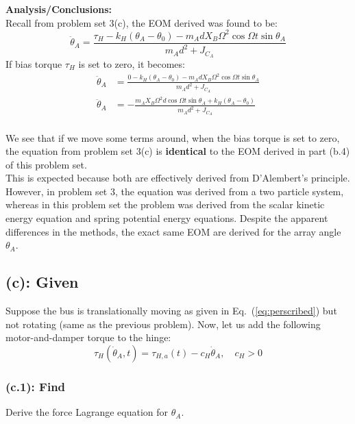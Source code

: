 \documentclass[titlepage]{article}
\begin{document}
\textbf{Analysis/Conclusions:}\\
Recall from problem set 3(c), the EOM derived was found to be:
\begin{equation}
	\ddot{\theta}_A=\frac{\tau_H-k_H(\theta_A-\theta_0)-m_AdX_B\Omega^2\cos\Omega t\sin\theta_A}{m_Ad^2+J_{C_A}}
\end{equation}
If bias torque $\tau_H$ is set to zero, it becomes:
\begin{equation}
	\begin{split}
		\ddot{\theta}_A&=\frac{0-k_H(\theta_A-\theta_0)-m_AdX_B\Omega^2\cos\Omega t\sin\theta_A}{m_Ad^2+J_{C_A}} \\
		\ddot{\theta}_A&=-\frac{m_AX_B\Omega^2d\cos\Omega t\sin\theta_A+k_H(\theta_A-\theta_0)}{m_Ad^2+J_{C_A}} \\
	\end{split}
\end{equation}

\begin{mdframed}[linewidth=1pt, innertopmargin=10pt, innerbottommargin=10pt]
	We see that if we move some terms around, when the bias torque is set to zero, the equation from problem set 3(c) is \textbf{identical} to the EOM derived in part (b.4) of this problem set. \\
	
	This is expected because both are effectively derived from D'Alembert's principle. However, in problem set 3, the equation was derived from a two particle system, whereas in this problem set the problem was derived from the scalar kinetic energy equation and spring potential energy equations. Despite the apparent differences in the methods, the exact same EOM are derived for the array angle $\theta_A$.
\end{mdframed}

\newpage

\subsection*{(c): Given}
Suppose the bus is translationally moving as given in Eq.~(\ref{eq:perscribed}) but not rotating (same as the previous problem). Now, let us add the following motor-and-damper torque to the hinge:
\begin{equation}
	\tau_H(\dot{\theta}_A,t)=\tau_{H,a}(t)-c_H\dot{\theta}_A,\quad c_H>0
	\label{eq:csetup}
\end{equation}

\subsubsection*{(c.1): Find}
Derive the force Lagrange equation for $\theta_A$.\\
\end{document}

